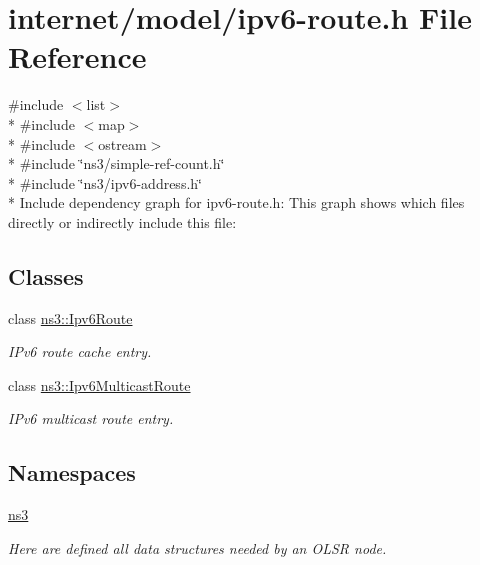 \hypertarget{ipv6-route_8h}{}\section{internet/model/ipv6-\/route.h File Reference}
\label{ipv6-route_8h}
{\ttfamily \#include $<$list$>$}\\*
{\ttfamily \#include $<$map$>$}\\*
{\ttfamily \#include $<$ostream$>$}\\*
{\ttfamily \#include \char`\"{}ns3/simple-\/ref-\/count.\+h\char`\"{}}\\*
{\ttfamily \#include \char`\"{}ns3/ipv6-\/address.\+h\char`\"{}}\\*
Include dependency graph for ipv6-\/route.h\+:
This graph shows which files directly or indirectly include this file\+:
\subsection*{Classes}
\begin{DoxyCompactItemize}
\item 
class \hyperlink{classns3_1_1Ipv6Route}{ns3\+::\+Ipv6\+Route}
\begin{DoxyCompactList}\small\item\em I\+Pv6 route cache entry. \end{DoxyCompactList}\item 
class \hyperlink{classns3_1_1Ipv6MulticastRoute}{ns3\+::\+Ipv6\+Multicast\+Route}
\begin{DoxyCompactList}\small\item\em I\+Pv6 multicast route entry. \end{DoxyCompactList}\end{DoxyCompactItemize}
\subsection*{Namespaces}
\begin{DoxyCompactItemize}
\item 
 \hyperlink{namespacens3}{ns3}
\begin{DoxyCompactList}\small\item\em Here are defined all data structures needed by an O\+L\+SR node. \end{DoxyCompactList}\end{DoxyCompactItemize}
